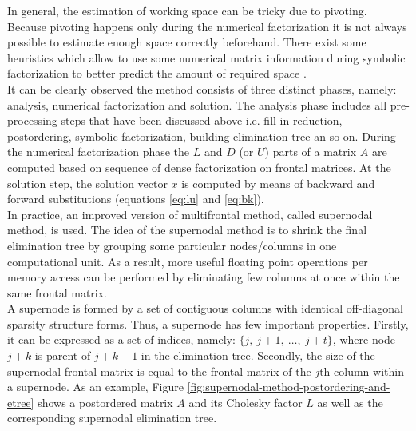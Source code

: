 In general, the estimation of working space can be tricky due to pivoting. Because pivoting happens only during the numerical factorization it is not always possible to estimate enough space correctly beforehand. There exist some heuristics which allow to use some numerical matrix information during symbolic factorization to better predict the amount of required space \cite{wsmp:direct-solution-of-general-system}.\\



It can be clearly observed the method consists of three distinct phases, namely: analysis, numerical factorization and solution. The analysis phase includes all pre-processing steps that have been discussed above i.e. fill-in reduction, postordering, symbolic factorization, building elimination tree an so on. During the numerical factorization phase the $L$ and $D$ (or $U$) parts of a matrix $A$ are computed based on sequence of dense factorization on frontal matrices. At the solution step, the solution vector $x$ is computed by means of backward and forward substitutions (equations \ref{eq:lu} and \ref{eq:bk}).\\


In practice, an improved version of multifrontal method, called supernodal method, is used. The idea of the supernodal method is to shrink the final elimination tree by grouping some particular nodes/columns in one computational unit. As a result, more useful floating point operations per memory access can be performed by eliminating few columns at once within the same frontal matrix.\\





A supernode is formed by a set of contiguous columns with identical off-diagonal sparsity structure forms. Thus, a supernode has few important properties. Firstly, it can be expressed as a set of indices, namely: $\{j, \: j+1, \: \dots, \:j + t\}$, where node $j + k$ is	parent of $j + k - 1$ in the elimination tree. Secondly, the size of the supernodal frontal matrix is equal to the frontal matrix of the $j$th column within a supernode. As an example, Figure \ref{fig:supernodal-method-postordering-and-etree} shows a postordered matrix $A$ and its Cholesky factor $L$ as well as the corresponding supernodal elimination tree.



